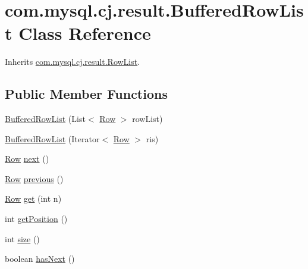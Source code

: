 \hypertarget{classcom_1_1mysql_1_1cj_1_1result_1_1_buffered_row_list}{}\section{com.\+mysql.\+cj.\+result.\+Buffered\+Row\+List Class Reference}
\label{classcom_1_1mysql_1_1cj_1_1result_1_1_buffered_row_list}


Inherits \mbox{\hyperlink{interfacecom_1_1mysql_1_1cj_1_1result_1_1_row_list}{com.\+mysql.\+cj.\+result.\+Row\+List}}.

\subsection*{Public Member Functions}
\begin{DoxyCompactItemize}
\item 
\mbox{\hyperlink{classcom_1_1mysql_1_1cj_1_1result_1_1_buffered_row_list_a605b13d1f1b48c03e7273e186b536a3a}{Buffered\+Row\+List}} (List$<$ \mbox{\hyperlink{interfacecom_1_1mysql_1_1cj_1_1result_1_1_row}{Row}} $>$ row\+List)
\item 
\mbox{\hyperlink{classcom_1_1mysql_1_1cj_1_1result_1_1_buffered_row_list_acced249ad4e80088c1ac7694ffcd52a4}{Buffered\+Row\+List}} (Iterator$<$ \mbox{\hyperlink{interfacecom_1_1mysql_1_1cj_1_1result_1_1_row}{Row}} $>$ ris)
\item 
\mbox{\hyperlink{interfacecom_1_1mysql_1_1cj_1_1result_1_1_row}{Row}} \mbox{\hyperlink{classcom_1_1mysql_1_1cj_1_1result_1_1_buffered_row_list_a70515abfd1dfda3133082fcde4e61aee}{next}} ()
\item 
\mbox{\hyperlink{interfacecom_1_1mysql_1_1cj_1_1result_1_1_row}{Row}} \mbox{\hyperlink{classcom_1_1mysql_1_1cj_1_1result_1_1_buffered_row_list_a899cd7f256715f653cb2faa2d8026491}{previous}} ()
\item 
\mbox{\hyperlink{interfacecom_1_1mysql_1_1cj_1_1result_1_1_row}{Row}} \mbox{\hyperlink{classcom_1_1mysql_1_1cj_1_1result_1_1_buffered_row_list_a84d3adb0ccd22e7ea988a25a6421948a}{get}} (int n)
\item 
int \mbox{\hyperlink{classcom_1_1mysql_1_1cj_1_1result_1_1_buffered_row_list_a6d18ed3e3cf3ebced974d1cd7d8ca9ec}{get\+Position}} ()
\item 
int \mbox{\hyperlink{classcom_1_1mysql_1_1cj_1_1result_1_1_buffered_row_list_a237ee911857a3afeb8641811508bb5b9}{size}} ()
\item 
boolean \mbox{\hyperlink{classcom_1_1mysql_1_1cj_1_1result_1_1_buffered_row_list_a66307a61a8611cb5c0d584157b3afe30}{has\+Next}} ()
\end{DoxyCompactItemize}

